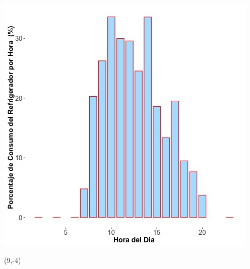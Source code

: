 \documentclass{article}\usepackage[]{graphicx}\usepackage[]{color}
\newenvironment{knitrout}{}{} %
\begin{document}
\begin{knitrout}
\color{fgcolor}
\includegraphics[scale=0.65]{figure/A29_fridge_energy_pct.jpg} 
\end{knitrout}

 \begin{textblock}{1}(9,-4)
\begin{minipage}{20em}
\begingroup

\endgroup
\end{minipage}
\end{textblock}

\vspace{20cm}
\end{document}
